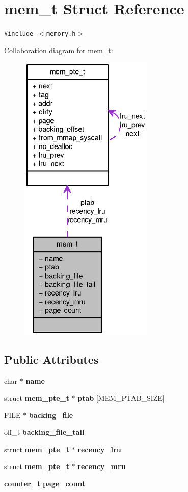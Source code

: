 \section{mem\_\-t Struct Reference}
\label{structmem__t}
{\tt \#include $<$memory.h$>$}

Collaboration diagram for mem\_\-t:\nopagebreak
\begin{figure}[H]
\begin{center}
\leavevmode
\includegraphics[height=400pt]{structmem__t__coll__graph}
\end{center}
\end{figure}
\subsection*{Public Attributes}
\begin{CompactItemize}
\item 
char $\ast$ {\bf name}
\item 
struct {\bf mem\_\-pte\_\-t} $\ast$ {\bf ptab} [MEM\_\-PTAB\_\-SIZE]
\item 
FILE $\ast$ {\bf backing\_\-file}
\item 
off\_\-t {\bf backing\_\-file\_\-tail}
\item 
struct {\bf mem\_\-pte\_\-t} $\ast$ {\bf recency\_\-lru}
\item 
struct {\bf mem\_\-pte\_\-t} $\ast$ {\bf recency\_\-mru}
\item 
{\bf counter\_\-t} {\bf page\_\-count}
\end{CompactItemize}


